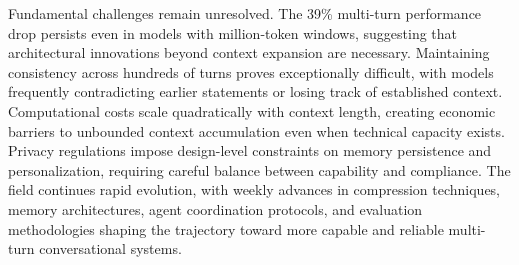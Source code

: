 Fundamental challenges remain unresolved. The 39\% multi-turn performance drop persists even in models with million-token windows, suggesting that architectural innovations beyond context expansion are necessary. Maintaining consistency across hundreds of turns proves exceptionally difficult, with models frequently contradicting earlier statements or losing track of established context. Computational costs scale quadratically with context length, creating economic barriers to unbounded context accumulation even when technical capacity exists. Privacy regulations impose design-level constraints on memory persistence and personalization, requiring careful balance between capability and compliance. The field continues rapid evolution, with weekly advances in compression techniques, memory architectures, agent coordination protocols, and evaluation methodologies shaping the trajectory toward more capable and reliable multi-turn conversational systems.
